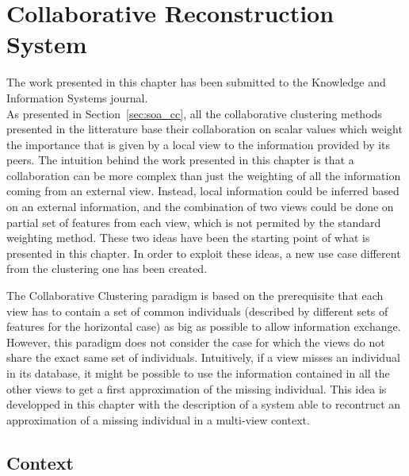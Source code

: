 %
\chapter{Collaborative Reconstruction System}

\minitoc{}
\newpage

The work presented in this chapter has been submitted to the Knowledge and Information Systems journal.\\

As presented in Section~\ref{sec:soa_cc}, all the collaborative clustering methods presented in the litterature base their collaboration on scalar values which weight the importance that is given by a local view to the information provided by its peers. The intuition behind the work presented in this chapter is that a collaboration can be more complex than just the weighting of all the information coming from an external view. Instead, local information could be inferred based on an external information, and the combination of two views could be done on partial set of features from each view, which is not permited by the standard weighting method. These two ideas have been the starting point of what is presented in this chapter. In order to exploit these ideas, a new use case different from the clustering one has been created.

The Collaborative Clustering paradigm is based on the prerequisite that each view has to contain a set of common individuals (described by different sets of features for the horizontal case) as big as possible to allow information exchange. However, this paradigm does not consider the case for which the views do not share the exact same set of individuals. Intuitively, if a view misses an individual in its database, it might be possible to use the information contained in all the other views to get a first approximation of the missing individual. This idea is developped in this chapter with the description of a system able to recontruct an approximation of a missing individual in a multi-view context.\\

\section{Context}
\label{sec:crs_context}

